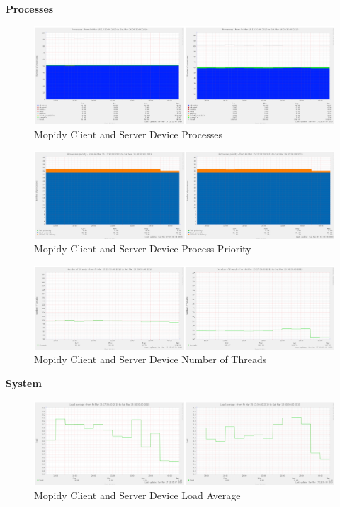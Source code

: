 \documentclass[11pt,a4paper,headinclude=false,footinclude=false]{scrreprt}
\begin{document}
\textbf{Processes}

\begin{figure}[H]
\includegraphics{ResultsAndAnalysis/MopidyServerTestImages/020MopidyProcesses.png}
\centering
\caption{Mopidy Client and Server Device Processes}
\label{MopidyProcesses}
\end{figure}

\begin{figure}[H]
\includegraphics{ResultsAndAnalysis/MopidyServerTestImages/021MopidyProcessPriority.png}
\centering
\caption{Mopidy Client and Server Device Process Priority}
\label{MopidyProcessPriority}
\end{figure}

\begin{figure}[H]
\includegraphics{ResultsAndAnalysis/MopidyServerTestImages/019MopidyNoOfThreads.png}
\centering
\caption{Mopidy Client and Server Device Number of Threads}
\label{MopidyNumThreads}
\end{figure}

\textbf{System}

\begin{figure}[H]
\includegraphics{ResultsAndAnalysis/MopidyServerTestImages/016MopidyLoadAverage.png}
\centering
\caption{Mopidy Client and Server Device Load Average}
\label{MopidyLoadAvg}
\end{figure}
\end{document}
